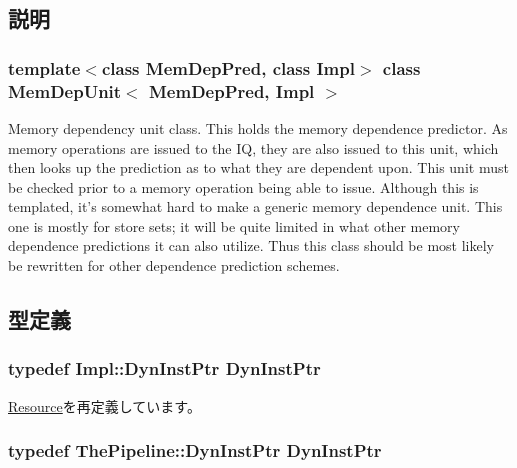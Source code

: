 \subsection{説明}
\subsubsection*{template$<$class MemDepPred, class Impl$>$ class MemDepUnit$<$ MemDepPred, Impl $>$}

Memory dependency unit class. This holds the memory dependence predictor. As memory operations are issued to the IQ, they are also issued to this unit, which then looks up the prediction as to what they are dependent upon. This unit must be checked prior to a memory operation being able to issue. Although this is templated, it's somewhat hard to make a generic memory dependence unit. This one is mostly for store sets; it will be quite limited in what other memory dependence predictions it can also utilize. Thus this class should be most likely be rewritten for other dependence prediction schemes. 

\subsection{型定義}
\hypertarget{classMemDepUnit_a028ce10889c5f6450239d9e9a7347976}{
\subsubsection[{DynInstPtr}]{\setlength{\rightskip}{0pt plus 5cm}typedef Impl::DynInstPtr {\bf DynInstPtr}}}
\label{classMemDepUnit_a028ce10889c5f6450239d9e9a7347976}


\hyperlink{classResource_af9d0c8a46736ba6aa2d8bb94da1a5e73}{Resource}を再定義しています。\hypertarget{classMemDepUnit_af9d0c8a46736ba6aa2d8bb94da1a5e73}{
\subsubsection[{DynInstPtr}]{\setlength{\rightskip}{0pt plus 5cm}typedef {\bf ThePipeline::DynInstPtr} {\bf DynInstPtr}}}
\label{classMemDepUnit_af9d0c8a46736ba6aa2d8bb94da1a5e73}


